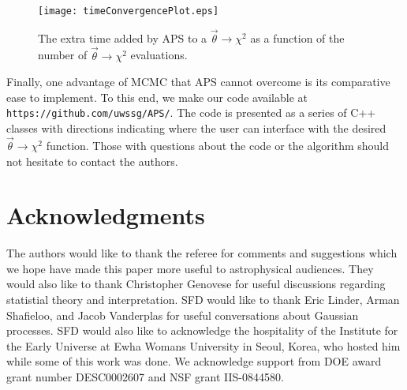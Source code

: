 \documentclass[useAMS,usenatbib]{aastex}
\begin{document}
\begin{figure}
\texttt{[image: timeConvergencePlot.eps]}
\caption{
The extra time added by APS to a $\vec{\theta}\rightarrow\chi^2$ 
as a function of the number of
$\vec{\theta}\rightarrow\chi^2$ evaluations.
}
\label{fig:time}
\end{figure}

Finally, one advantage of MCMC that APS cannot overcome is its comparative ease to
implement.  To this end,
we make our code available at \verb|https://github.com/uwssg/APS/|.  
The code is presented as a series of C++ classes with directions
indicating where the user can interface with 
the desired $\vec{\theta}\rightarrow\chi^2$ function.  
Those with questions about the code or the algorithm should not
hesitate to contact the authors.


\section*{Acknowledgments}
The authors would like to thank the referee for comments and suggestions
which we hope have made this paper more useful to astrophysical audiences.
They would also like to thank Christopher Genovese for useful discussions
regarding statistial theory and interpretation.
SFD would like to thank Eric Linder, Arman Shafieloo, and Jacob Vanderplas 
for useful conversations
about Gaussian processes.  SFD would also like to acknowledge the hospitality of
the Institute for the Early Universe at Ewha Womans University in 
Seoul, Korea, who
hosted him while some of this work was done.
We acknowledge support from DOE award grant number DESC0002607 and NSF grant
IIS-0844580.
\end{document}
